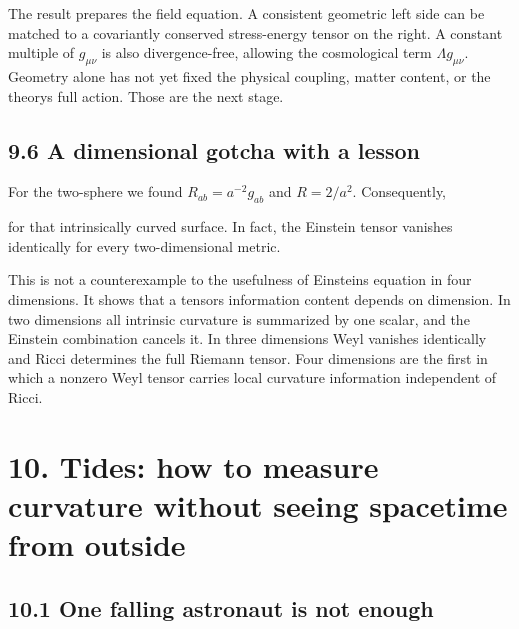 \documentclass[
  11pt,
  letterpaper,
  oneside,
  openany]{scrbook}
\begin{document}
The result prepares the field equation. A consistent geometric left side
can be matched to a covariantly conserved stress-energy tensor on the
right. A constant multiple of \(g_{\mu\nu}\) is also divergence-free,
allowing the cosmological term \(\Lambda g_{\mu\nu}\). Geometry alone
has not yet fixed the physical coupling, matter content, or the
theory\textquotesingle s full action. Those are the next stage.

\hypertarget{a-dimensional-gotcha-with-a-lesson}{%
\section{9.6 A dimensional gotcha with a
lesson}\label{a-dimensional-gotcha-with-a-lesson}}

For the two-sphere we found \(R_{ab}=a^{-2}g_{ab}\) and \(R=2/a^2\).
Consequently,

\begin{center}
\begingroup
{}
\ifdim\wd\grmathbox>\linewidth
\resizebox{\linewidth}{!}{\usebox{\grmathbox}}
\else\usebox{\grmathbox}\fi
\endgroup
\end{center}

for that intrinsically curved surface. In fact, the Einstein tensor
vanishes identically for every two-dimensional metric.

This is not a counterexample to the usefulness of
Einstein\textquotesingle s equation in four dimensions. It shows that a
tensor\textquotesingle s information content depends on dimension. In
two dimensions all intrinsic curvature is summarized by one scalar, and
the Einstein combination cancels it. In three dimensions Weyl vanishes
identically and Ricci determines the full Riemann tensor. Four
dimensions are the first in which a nonzero Weyl tensor carries local
curvature information independent of Ricci.

\hypertarget{chapter-10}{%
\chapter{10. Tides: how to measure curvature without seeing spacetime
from outside}\label{chapter-10}}

\hypertarget{one-falling-astronaut-is-not-enough}{%
\section{10.1 One falling astronaut is not
enough}\label{one-falling-astronaut-is-not-enough}}
\end{document}
